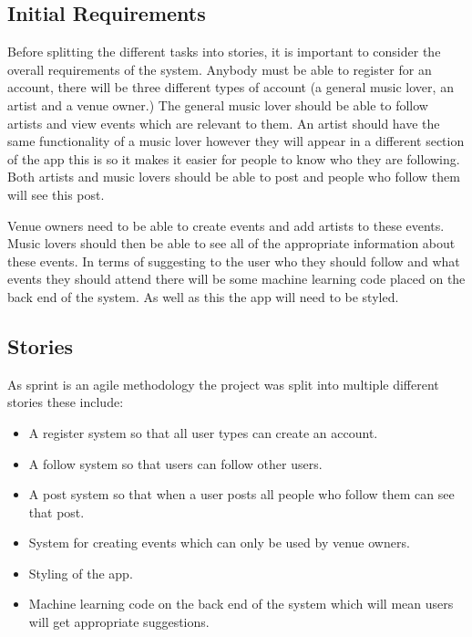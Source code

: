 \subsection{Initial Requirements}
Before splitting the different tasks into stories, it is important to consider the overall requirements of the system. Anybody must be able to register for an account, there will be three different types of account (a general music lover, an artist and a venue owner.) The general music lover should be able to follow artists and view events which are relevant to them. An artist should have the same functionality of a music lover however they will appear in a different section of the app this is so it makes it easier for people to know who they are following. Both artists and music lovers should be able to post and people who follow them will see this post.

Venue owners need to be able to create events and add artists to these events. Music lovers should then be able to see all of the appropriate information about these events. In terms of suggesting to the user who they should follow and what events they should attend there will be some machine learning code placed on the back end of the system. As well as this the app will need to be styled.

\subsection{Stories}
As sprint is an agile methodology the project was split into multiple different stories these include:
\begin{itemize}
	\item A register system so that all user types can create an account.
	\item A follow system so that users can follow other users.
	\item A post system so that when a user posts all people who follow them can see that post.
	\item System for creating events which can only be used by venue owners.
	\item Styling of the app.
	\item Machine learning code on the back end of the system which will mean users will get appropriate suggestions.
\end{itemize}